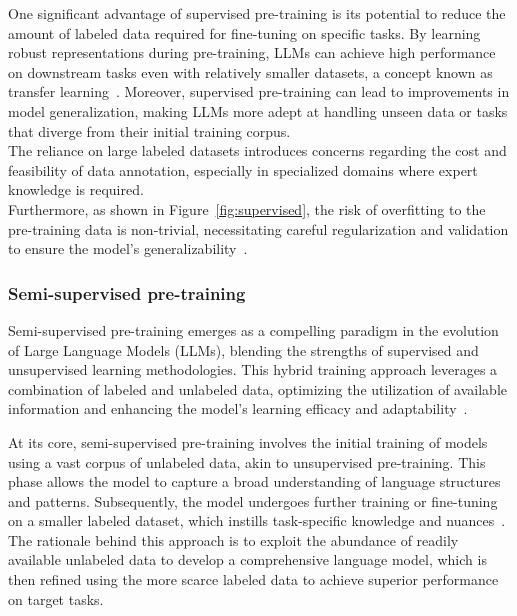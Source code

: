 One significant advantage of supervised pre-training is its potential to reduce the amount of labeled data required for fine-tuning on specific tasks.
By learning robust representations during pre-training, LLMs can achieve high performance on downstream tasks even with relatively smaller datasets, a concept known as transfer learning~\cite{ruder2019transfer}.
Moreover, supervised pre-training can lead to improvements in model generalization, making LLMs more adept at handling unseen data or tasks that diverge from their initial training corpus.\\

The reliance on large labeled datasets introduces concerns regarding the cost and feasibility of data annotation, especially in specialized domains where expert knowledge is required.\\
Furthermore, as shown in Figure~\ref{fig:supervised}, the risk of overfitting to the pre-training data is non-trivial, necessitating careful regularization and validation to ensure the model's generalizability~\cite{howard2018universal}.

\subsubsection{Semi-supervised pre-training}
\label{subsubsec:semi-supervised-pre-training}

Semi-supervised pre-training emerges as a compelling paradigm in the evolution of Large Language Models (LLMs), blending the strengths of supervised and unsupervised learning methodologies.
This hybrid training approach leverages a combination of labeled and unlabeled data, optimizing the utilization of available information and enhancing the model's learning efficacy and adaptability~\cite{zhu2005semi, chapelle2009semi}.

At its core, semi-supervised pre-training involves the initial training of models using a vast corpus of unlabeled data, akin to unsupervised pre-training.
This phase allows the model to capture a broad understanding of language structures and patterns.
Subsequently, the model undergoes further training or fine-tuning on a smaller labeled dataset, which instills task-specific knowledge and nuances~\cite{ruder2019transfer, yang2017transfer}.
The rationale behind this approach is to exploit the abundance of readily available unlabeled data to develop a comprehensive language model, which is then refined using the more scarce labeled data to achieve superior performance on target tasks.

